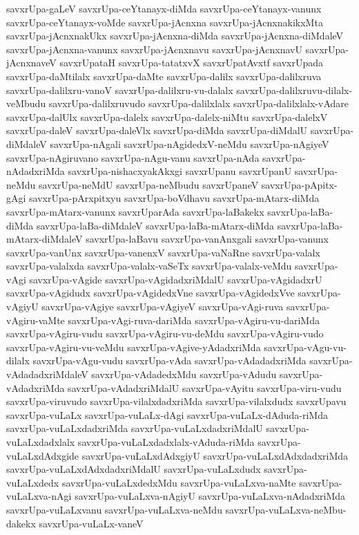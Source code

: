 {savxrUpa-gaLeV
savxrUpa-ceYtanayx-diMda
savxrUpa-ceYtanayx-vanunx
savxrUpa-ceYtanayx-voMde
savxrUpa-jAcnxna
savxrUpa-jAcnxnakikxMta
savxrUpa-jAcnxnakUkx
savxrUpa-jAcnxna-diMda
savxrUpa-jAcnxna-diMdaleV
savxrUpa-jAcnxna-vanunx
savxrUpa-jAcnxnavu
savxrUpa-jAcnxnavU
savxrUpa-jAcnxnaveV
savxrUpataH
savxrUpa-tatatxvX
savxrUpatAvxtf
savxrUpada
savxrUpa-daMtilalx
savxrUpa-daMte
savxrUpa-dalilx
savxrUpa-dalilxruva
savxrUpa-dalilxru-vanoV
savxrUpa-dalilxru-vu-dalalx
savxrUpa-dalilxruvu-dilalx-veMbudu
savxrUpa-dalilxruvudo
savxrUpa-dalilxlalx
savxrUpa-dalilxlalx-vAdare
savxrUpa-dalUlx
savxrUpa-dalelx
savxrUpa-dalelx-niMtu
savxrUpa-dalelxV
savxrUpa-daleV
savxrUpa-daleVlx
savxrUpa-diMda
savxrUpa-diMdalU
savxrUpa-diMdaleV
savxrUpa-nAgali
savxrUpa-nAgidedxV-neMdu
savxrUpa-nAgiyeV
savxrUpa-nAgiruvano
savxrUpa-nAgu-vanu
savxrUpa-nAda
savxrUpa-nAdadxriMda
savxrUpa-nishacxyakAkxgi
savxrUpanu
savxrUpanU
savxrUpa-neMdu
savxrUpa-neMdU
savxrUpa-neMbudu
savxrUpaneV
savxrUpa-pApitx-gAgi
savxrUpa-pArxpitxyu
savxrUpa-boVdhavu
savxrUpa-mAtarx-diMda
savxrUpa-mAtarx-vanunx
savxrUparAda
savxrUpa-laBakekx
savxrUpa-laBa-diMda
savxrUpa-laBa-diMdaleV
savxrUpa-laBa-mAtarx-diMda
savxrUpa-laBa-mAtarx-diMdaleV
savxrUpa-laBavu
savxrUpa-vanAnxgali
savxrUpa-vanunx
savxrUpa-vanUnx
savxrUpa-vanenxV
savxrUpa-vaNaRne
savxrUpa-valalx
savxrUpa-valalxda
savxrUpa-valalx-vaSeTx
savxrUpa-valalx-veMdu
savxrUpa-vAgi
savxrUpa-vAgide
savxrUpa-vAgidadxriMdalU
savxrUpa-vAgidadxrU
savxrUpa-vAgidudx
savxrUpa-vAgidedxVne
savxrUpa-vAgidedxVve
savxrUpa-vAgiyU
savxrUpa-vAgiye
savxrUpa-vAgiyeV
savxrUpa-vAgi-ruva
savxrUpa-vAgiru-vaMte
savxrUpa-vAgi-ruva-dariMda
savxrUpa-vAgiru-vu-dariMda
savxrUpa-vAgiru-vudu
savxrUpa-vAgiru-vu-deMdu
savxrUpa-vAgiru-vudo
savxrUpa-vAgiru-vu-veMdu
savxrUpa-vAgive-yAdadxriMda
savxrUpa-vAgu-vu-dilalx
savxrUpa-vAgu-vudu
savxrUpa-vAda
savxrUpa-vAdadadxriMda
savxrUpa-vAdadadxriMdaleV
savxrUpa-vAdadedxMdu
savxrUpa-vAdudu
savxrUpa-vAdadxriMda
savxrUpa-vAdadxriMdalU
savxrUpa-vAyitu
savxrUpa-viru-vudu
savxrUpa-viruvudo
savxrUpa-vilalxdadxriMda
savxrUpa-vilalxdudx
savxrUpavu
savxrUpa-vuLaLx
savxrUpa-vuLaLx-dAgi
savxrUpa-vuLaLx-dAduda-riMda
savxrUpa-vuLaLxdadxriMda
savxrUpa-vuLaLxdadxriMdalU
savxrUpa-vuLaLxdadxlalx
savxrUpa-vuLaLxdadxlalx-vAduda-riMda
savxrUpa-vuLaLxdAdxgide
savxrUpa-vuLaLxdAdxgiyU
savxrUpa-vuLaLxdAdxdadxriMda
savxrUpa-vuLaLxdAdxdadxriMdalU
savxrUpa-vuLaLxdudx
savxrUpa-vuLaLxdedx
savxrUpa-vuLaLxdedxMdu
savxrUpa-vuLaLxva-naMte
savxrUpa-vuLaLxva-nAgi
savxrUpa-vuLaLxva-nAgiyU
savxrUpa-vuLaLxva-nAdadxriMda
savxrUpa-vuLaLxvanu
savxrUpa-vuLaLxva-neMdu
savxrUpa-vuLaLxva-neMbu-dakekx
savxrUpa-vuLaLx-vaneV
}
